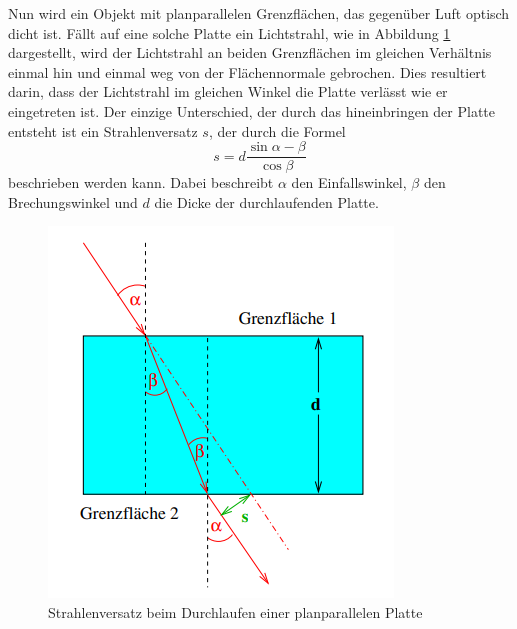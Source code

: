 Nun wird ein Objekt mit planparallelen Grenzflächen, das gegenüber Luft optisch dicht ist.
Fällt auf eine solche Platte ein Lichtstrahl, wie in Abbildung \ref{fig:StrV} dargestellt, wird
der Lichtstrahl an beiden Grenzflächen im gleichen Verhältnis einmal hin und einmal weg von der 
Flächennormale gebrochen. Dies resultiert darin, dass der Lichtstrahl im gleichen Winkel die Platte 
verlässt wie er eingetreten ist. Der einzige Unterschied, der durch das hineinbringen der Platte entsteht
ist ein Strahlenversatz $s$, der durch die Formel
\begin{equation}
    s=d\frac{\sin{\alpha-\beta}}{\cos{\beta}}
    \label{eq:Strahlenversatz}
\end{equation}
beschrieben werden kann. Dabei beschreibt $\alpha$ den Einfallswinkel, $\beta$ den Brechungswinkel und $d$
die Dicke der durchlaufenden Platte.
\begin{figure}
    \centering
    \includegraphics{content/Strahlenversatz.png}
    \caption{Strahlenversatz beim Durchlaufen einer planparallelen Platte\cite{V400}}
    \label{fig:StrV}
\end{figure}
